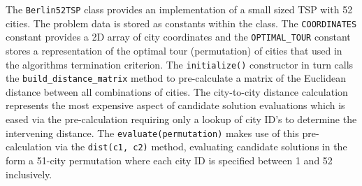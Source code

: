 The \texttt{Berlin52TSP} class provides an implementation of a small sized TSP with 52 cities. The problem data is stored as constants within the class. The \texttt{COORDINATES} constant provides a 2D array of city coordinates and the \texttt{OPTIMAL\_TOUR} constant stores a representation of the optimal tour (permutation) of cities that used in the algorithms termination criterion. The \texttt{initialize()} constructor in turn calls the \texttt{build\_distance\_matrix} method to pre-calculate a matrix of the Euclidean distance between all combinations of cities. The city-to-city distance calculation represents the most expensive aspect of candidate solution evaluations which is eased via the pre-calculation requiring only a lookup of city ID's to determine the intervening distance. The \texttt{evaluate(permutation)} makes use of this pre-calculation via the \texttt{dist(c1, c2)} method, evaluating candidate solutions in the form a 51-city permutation where each city ID is specified between 1 and 52 inclusively.

